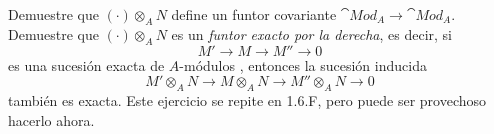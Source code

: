 \setcounter{neje}{7}
\begin{nejer}
Demuestre que $(\cdot)\otimes_A N$ define un funtor covariante $\cat{Mod}_A \to \cat{Mod}_A$. Demuestre que $(\cdot) \otimes_A N$ es un \emph{funtor exacto por la derecha}, es decir, si
$$M' \longrightarrow M \longrightarrow M'' \longrightarrow 0$$
es una sucesión exacta de $A$-módulos%
, entonces la sucesión inducida
$$M' \otimes_A N \longrightarrow M \otimes_A N \longrightarrow M'' \otimes_A N \longrightarrow 0$$
también es exacta. Este ejercicio se repite en 1.6.F, pero puede ser provechoso hacerlo ahora. 
\end{nejer}

